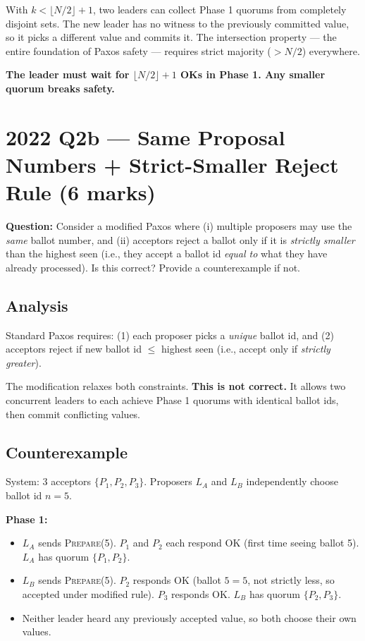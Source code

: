 \documentclass[12pt,a4paper]{article}
\begin{document}
With $k < \lfloor N/2\rfloor + 1$, two leaders can collect Phase 1 quorums from completely disjoint sets. The new leader has no witness to the previously committed value, so it picks a different value and commits it. The intersection property --- the entire foundation of Paxos safety --- requires strict majority ($> N/2$) everywhere.

\textbf{The leader must wait for $\lfloor N/2\rfloor + 1$ OKs in Phase 1. Any smaller quorum breaks safety.}

\section{2022 Q2b --- Same Proposal Numbers + Strict-Smaller Reject Rule (6 marks)}

\textbf{Question:} Consider a modified Paxos where (i) multiple proposers may use the \emph{same} ballot number, and (ii) acceptors reject a ballot only if it is \emph{strictly smaller} than the highest seen (i.e., they accept a ballot id \emph{equal to} what they have already processed). Is this correct? Provide a counterexample if not.

\subsection*{Analysis}

Standard Paxos requires: (1) each proposer picks a \emph{unique} ballot id, and (2) acceptors reject if new ballot id $\leq$ highest seen (i.e., accept only if \emph{strictly greater}).

The modification relaxes both constraints. \textbf{This is not correct.} It allows two concurrent leaders to each achieve Phase 1 quorums with identical ballot ids, then commit conflicting values.

\subsection*{Counterexample}

System: 3 acceptors $\{P_1, P_2, P_3\}$. Proposers $L_A$ and $L_B$ independently choose ballot id $n = 5$.

\medskip
\textbf{Phase 1:}
\begin{itemize}[noitemsep]
  \item $L_A$ sends \textsc{Prepare}(5). $P_1$ and $P_2$ each respond OK (first time seeing ballot 5). $L_A$ has quorum $\{P_1, P_2\}$.
  \item $L_B$ sends \textsc{Prepare}(5). $P_2$ responds OK (ballot $5 = 5$, not strictly less, so accepted under modified rule). $P_3$ responds OK. $L_B$ has quorum $\{P_2, P_3\}$.
  \item Neither leader heard any previously accepted value, so both choose their own values.
\end{itemize}
\end{document}
